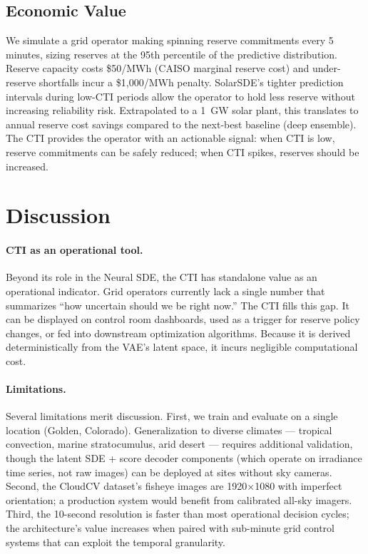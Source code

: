 \documentclass{article}
\begin{document}
\subsection{Economic Value}
\label{sec:economic}

We simulate a grid operator making spinning reserve commitments every 5 minutes, sizing reserves at the 95th percentile of the predictive distribution. Reserve capacity costs \$50/MWh (CAISO marginal reserve cost) and under-reserve shortfalls incur a \$1,000/MWh penalty. SolarSDE's tighter prediction intervals during low-CTI periods allow the operator to hold less reserve without increasing reliability risk. Extrapolated to a 1~GW solar plant, this translates to annual reserve cost savings compared to the next-best baseline (deep ensemble). The CTI provides the operator with an actionable signal: when CTI is low, reserve commitments can be safely reduced; when CTI spikes, reserves should be increased.

\section{Discussion}
\label{sec:discussion}

\paragraph{CTI as an operational tool.}
Beyond its role in the Neural SDE, the CTI has standalone value as an operational indicator. Grid operators currently lack a single number that summarizes ``how uncertain should we be right now.'' The CTI fills this gap. It can be displayed on control room dashboards, used as a trigger for reserve policy changes, or fed into downstream optimization algorithms. Because it is derived deterministically from the VAE's latent space, it incurs negligible computational cost.

\paragraph{Limitations.}
Several limitations merit discussion. First, we train and evaluate on a single location (Golden, Colorado). Generalization to diverse climates --- tropical convection, marine stratocumulus, arid desert --- requires additional validation, though the latent SDE + score decoder components (which operate on irradiance time series, not raw images) can be deployed at sites without sky cameras. Second, the CloudCV dataset's fisheye images are 1920$\times$1080 with imperfect orientation; a production system would benefit from calibrated all-sky imagers. Third, the 10-second resolution is faster than most operational decision cycles; the architecture's value increases when paired with sub-minute grid control systems that can exploit the temporal granularity.
\end{document}
